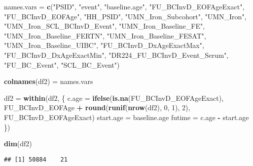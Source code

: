 \documentclass[
]{article}
\newenvironment{Shaded}{\begin{snugshade}}{\end{snugshade}}
\newcommand{\CommentTok}[1]{\textcolor[rgb]{0.56,0.35,0.01}{\textit{#1}}}
\newcommand{\DecValTok}[1]{\textcolor[rgb]{0.00,0.00,0.81}{#1}}
\newcommand{\KeywordTok}[1]{\textcolor[rgb]{0.13,0.29,0.53}{\textbf{#1}}}
\newcommand{\NormalTok}[1]{#1}
\newcommand{\OperatorTok}[1]{\textcolor[rgb]{0.81,0.36,0.00}{\textbf{#1}}}
\newcommand{\StringTok}[1]{\textcolor[rgb]{0.31,0.60,0.02}{#1}}
\begin{document}
\begin{Shaded}
\begin{Highlighting}[]
\NormalTok{names.vars =}\StringTok{ }\KeywordTok{c}\NormalTok{(}\StringTok{"PSID"}\NormalTok{, }\StringTok{"event"}\NormalTok{, }\StringTok{"baseline.age"}\NormalTok{, }\StringTok{"FU_BCInvD_EOFAgeExact"}\NormalTok{, }\StringTok{"FU_BCInvD_EOFAge"}\NormalTok{, }
    \StringTok{"HH_PSID"}\NormalTok{, }\StringTok{"UMN_Iron_Subcohort"}\NormalTok{, }\StringTok{"UMN_Iron"}\NormalTok{, }\StringTok{"UMN_Iron_SCL_BCInvD_Event"}\NormalTok{, }\StringTok{"UMN_Iron_Baseline_FE"}\NormalTok{, }
    \StringTok{"UMN_Iron_Baseline_FERTN"}\NormalTok{, }\StringTok{"UMN_Iron_Baseline_FESAT"}\NormalTok{, }\StringTok{"UMN_Iron_Baseline_UIBC"}\NormalTok{, }
    \StringTok{"FU_BCInvD_DxAgeExactMax"}\NormalTok{, }\StringTok{"FU_BCInvD_DxAgeExactMin"}\NormalTok{, }\StringTok{"DR224_FU_BCInvD_Event_Serum"}\NormalTok{, }
    \StringTok{"FU_BC_Event"}\NormalTok{, }\StringTok{"SCL_BC_Event"}\NormalTok{)}

\KeywordTok{colnames}\NormalTok{(df2) =}\StringTok{ }\NormalTok{names.vars}


\NormalTok{df2 =}\StringTok{ }\KeywordTok{within}\NormalTok{(df2, \{}
\NormalTok{    c.age =}\StringTok{ }\KeywordTok{ifelse}\NormalTok{(}\KeywordTok{is.na}\NormalTok{(FU_BCInvD_EOFAgeExact), FU_BCInvD_EOFAge }\OperatorTok{+}\StringTok{ }\KeywordTok{round}\NormalTok{(}\KeywordTok{runif}\NormalTok{(}\KeywordTok{nrow}\NormalTok{(df2), }
        \DecValTok{0}\NormalTok{, }\DecValTok{1}\NormalTok{), }\DecValTok{2}\NormalTok{), FU_BCInvD_EOFAgeExact)}
\NormalTok{    start.age =}\StringTok{ }\NormalTok{baseline.age}
\NormalTok{    futime =}\StringTok{ }\NormalTok{c.age }\OperatorTok{-}\StringTok{ }\NormalTok{start.age}
\NormalTok{\})}

\KeywordTok{dim}\NormalTok{(df2)}
\end{Highlighting}
\end{Shaded}

\begin{verbatim}
## [1] 50884    21
\end{verbatim}

\begin{Shaded}
\end{Shaded}
\end{document}

